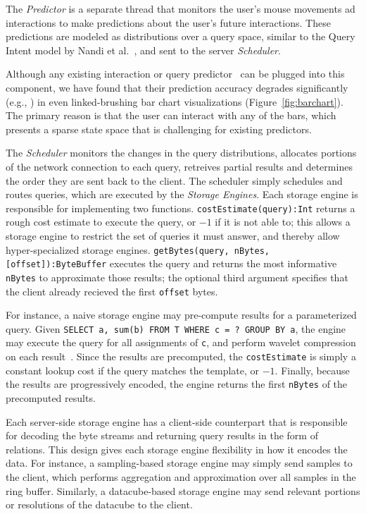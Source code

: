 The {\it Predictor} is a separate thread that monitors the user's mouse movements ad interactions to make predictions about the user's future interactions.  These predictions are modeled as distributions over a query space, similar to the Query Intent model by Nandi et al.~\cite{gesturequery}, and sent to the server {\it Scheduler}.

 Although any existing interaction or query predictor~\cite{} can be plugged into this component, we have found that their prediction accuracy degrades significantly (e.g., ) in even linked-brushing bar chart visualizations (Figure~\ref{fig:barchart}).  The primary reason is that the user can interact with any of the  bars, which presents a sparse state space that is challenging for existing predictors.


The {\it Scheduler} monitors the changes in the query distributions, allocates portions of the network connection to each query, retreives partial results and determines the order they are sent back to the client.  The scheduler simply schedules and routes queries, which are executed by the {\it Storage Engines}.  Each storage engine is responsible for implementing two functions.     \texttt{costEstimate(query):Int} returns a rough cost estimate to execute the query, or $-1$ if it is not able to; this allows a storage engine to restrict the set of queries it must answer, and thereby allow hyper-specialized storage engines.  \texttt{getBytes(query, nBytes, [offset]):ByteBuffer} executes the query and returns the most informative \texttt{nBytes} to approximate those results; the optional third argument specifies that the client already recieved the first \texttt{offset} bytes.

For instance, a naive storage engine may pre-compute results for a parameterized query.  Given \texttt{SELECT a, sum(b) FROM T WHERE c = ? GROUP BY a}, the engine may execute the query for all assignments of \texttt{c}, and perform wavelet compression on each result~\cite{malvar1999fast}.  Since the results are precomputed, the \texttt{costEstimate} is simply a constant lookup cost if the query matches the template, or $-1$.  Finally, because the results are progressively encoded, the engine returns the first \texttt{nBytes} of the precomputed results.  

Each server-side storage engine has a client-side counterpart that is responsible for decoding the byte streams and returning query results in the form of relations.  This design gives each storage engine flexibility in how it encodes the data.  For instance, a sampling-based storage engine may simply send samples to the client, which performs aggregation and approximation over all samples in the ring buffer.  Similarly, a datacube-based storage engine may send relevant portions or resolutions of the datacube to the client.

